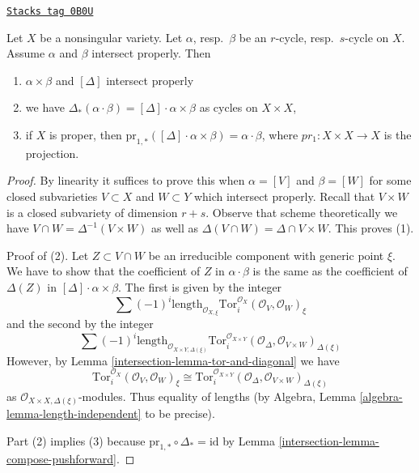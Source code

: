 \begin{lemma}
\label{intersection-lemma-reduction-diagonal}
\href{https://stacks.math.columbia.edu/tag/0B0U}{\texttt{Stacks tag 0B0U}}

Let $X$ be a nonsingular variety. Let $\alpha$, resp.\ $\beta$
be an $r$-cycle, resp.\ $s$-cycle on $X$. Assume $\alpha$ and $\beta$
intersect properly. Then
\begin{enumerate}
\item $\alpha \times \beta$ and $[\Delta]$ intersect properly
\item we have $\Delta_*(\alpha \cdot \beta) = [\Delta] \cdot \alpha\times\beta$
as cycles on $X \times X$,
\item if $X$ is proper, then
$\text{pr}_{1, *}([\Delta] \cdot \alpha\times\beta) = \alpha\cdot\beta$,
where $pr_1 : X\times X \to X$ is the projection.
\end{enumerate}
\end{lemma}

\begin{proof}

By linearity it suffices to prove this when $\alpha = [V]$ and $\beta = [W]$
for some closed subvarieties $V \subset X$ and $W \subset Y$ which intersect
properly. Recall that $V \times W$ is a closed subvariety of dimension $r + s$.
Observe that scheme theoretically we have
$V \cap W = \Delta^{-1}(V \times W)$ as well as
$\Delta(V \cap W) = \Delta \cap V \times W$.
This proves (1).

\medskip\noindent
Proof of (2). Let $Z \subset V \cap W$ be an irreducible component
with generic point $\xi$. We have to show that the coefficient of
$Z$ in $\alpha \cdot \beta$ is the same as the coefficient of
$\Delta(Z)$ in $[\Delta] \cdot \alpha \times \beta$. The first is given
by the integer
$$
\sum (-1)^i
\text{length}_{\mathcal{O}_{X, \xi}}
\text{Tor}_i^{\mathcal{O}_X}(\mathcal{O}_V, \mathcal{O}_W)_\xi
$$
and the second by the integer
$$
\sum (-1)^i
\text{length}_{\mathcal{O}_{X \times Y, \Delta(\xi)}}
\text{Tor}_i^{\mathcal{O}_{X \times Y}}(
\mathcal{O}_\Delta, \mathcal{O}_{V \times W})_{\Delta(\xi)}
$$
However, by Lemma \ref{intersection-lemma-tor-and-diagonal} we have
$$
\text{Tor}_i^{\mathcal{O}_X}(\mathcal{O}_V, \mathcal{O}_W)_\xi \cong
\text{Tor}_i^{\mathcal{O}_{X \times Y}}(
\mathcal{O}_\Delta, \mathcal{O}_{V \times W})_{\Delta(\xi)}
$$
as $\mathcal{O}_{X \times X, \Delta(\xi)}$-modules. Thus equality
of lengths (by Algebra, Lemma \ref{algebra-lemma-length-independent}
to be precise).

\medskip\noindent
Part (2) implies (3) because
$\text{pr}_{1, *} \circ \Delta_* = \text{id}$ by
Lemma \ref{intersection-lemma-compose-pushforward}.
\end{proof}

